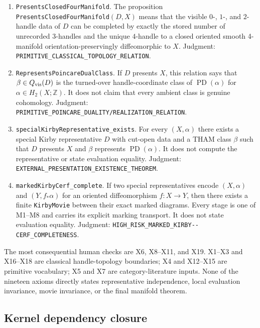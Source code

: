 \begin{enumerate}[label=\textbf{X\arabic*.},leftmargin=*]
\item \texttt{PresentsClosedFourManifold}.
The proposition \nolinkurl{PresentsClosedFourManifold}$(D,X)$ means that the visible
$0$-, $1$-, and $2$-handle data of $D$ can be completed by exactly the stored
number of unrecorded $3$-handles and the unique $4$-handle to a closed oriented
smooth 4-manifold orientation-preservingly diffeomorphic to $X$.  Judgment:
\nolinkurl{PRIMITIVE_CLASSICAL_TOPOLOGY_RELATION}.

\item \texttt{RepresentsPoincareDualClass}.
If $D$ presents $X$, this relation says that
$\beta\in Q_{\rm vis}(D)$ is the turned-over handle-coordinate class of
$\operatorname{PD}(\alpha)$ for
$\alpha\in H_2(X;\mathbb Z)$.  It does not claim that every ambient class is
genuine cohomology.  Judgment:
\nolinkurl{PRIMITIVE_POINCARE_DUALITY/REALIZATION_RELATION}.

\item \nolinkurl{specialKirbyRepresentative_exists}.
For every $(X,\alpha)$ there exists a special Kirby representative $D$ with
cut-open data and a THAM class $\beta$ such that $D$ presents $X$ and $\beta$
represents $\operatorname{PD}(\alpha)$.  It does not compute the representative
or state evaluation equality.  Judgment:
\nolinkurl{EXTERNAL_PRESENTATION_EXISTENCE_THEOREM}.

\item \nolinkurl{markedKirbyCerf_complete}.
If two special representatives encode $(X,\alpha)$ and
$(Y,f_*\alpha)$ for an oriented diffeomorphism $f\colon X\to Y$, then there
exists a finite \texttt{KirbyMovie} between their exact marked diagrams.  Every
stage is one of M1--M8 and carries its explicit marking transport.  It does not
state evaluation equality.  Judgment:
\nolinkurl{HIGH_RISK_MARKED_KIRBY--CERF_COMPLETENESS}.

\end{enumerate}

The most consequential human checks are X6, X8--X11, and X19.  X1--X3 and
X16--X18 are classical handle-topology boundaries; X4 and X12--X15 are
primitive vocabulary; X5 and X7 are category-literature inputs.  None of the
nineteen axioms directly states representative independence, local evaluation
invariance, movie invariance, or the final manifold theorem.

\subsection{Kernel dependency closure}
\label{app:lean-kernel-closure}


